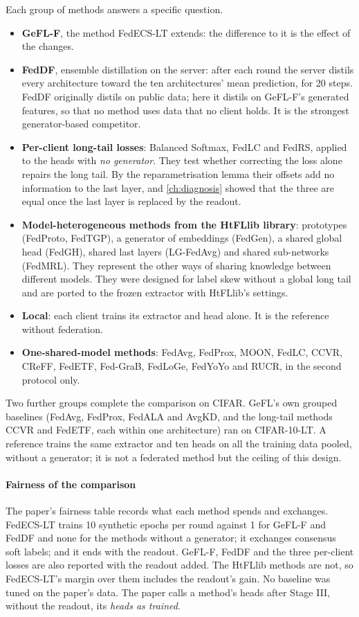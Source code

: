 Each group of methods answers a specific question.
\begin{itemize}
\item \textbf{GeFL-F}, the method FedECS-LT extends: the difference to it is the effect of the changes.
\item \textbf{FedDF}, ensemble distillation on the server: after each round the server distils every architecture
toward the ten architectures' mean prediction, for 20 steps. FedDF originally distils on public data; here it distils
on GeFL-F's generated features, so that no method uses data that no client holds. It is the strongest generator-based
competitor.
\item \textbf{Per-client long-tail losses}: Balanced Softmax, FedLC and FedRS, applied to the heads with \emph{no
generator}. They test whether correcting the loss alone repairs the long tail. By the reparametrisation lemma their
offsets add no information to the last layer, and \cref{ch:diagnosis} showed that the three are equal once the last
layer is replaced by the readout.
\item \textbf{Model-heterogeneous methods from the HtFLlib library}: prototypes (FedProto, FedTGP), a generator of
embeddings (FedGen), a shared global head (FedGH), shared last layers (LG-FedAvg) and shared sub-networks (FedMRL). They
represent the other ways of sharing knowledge between different models. They were designed for label skew without a
global long tail and are ported to the frozen extractor with HtFLlib's settings.
\item \textbf{Local}: each client trains its extractor and head alone. It is the reference without federation.
\item \textbf{One-shared-model methods}: FedAvg, FedProx, MOON, FedLC, CCVR, CReFF, FedETF, Fed-GraB, FedLoGe, FedYoYo
and RUCR, in the second protocol only.
\end{itemize}
Two further groups complete the comparison on CIFAR. GeFL's own grouped baselines (FedAvg, FedProx, FedALA and AvgKD,
and the long-tail methods CCVR and FedETF, each within one architecture) ran on CIFAR-10-LT. A reference trains the
same extractor and ten heads on all the training data pooled, without a generator; it is not a federated method but
the ceiling of this design.

\paragraph{Fairness of the comparison} The paper's fairness table records what each method spends and exchanges.
FedECS-LT trains 10 synthetic epochs per round against 1 for GeFL-F and FedDF and none for the methods without a
generator; it exchanges consensus soft labels; and it ends with the readout. GeFL-F, FedDF and the three per-client losses are
also reported with the readout added. The HtFLlib methods are not, so FedECS-LT's margin over them includes the
readout's gain. No baseline was tuned on the paper's data. The paper calls a method's heads after Stage III, without
the readout, its \emph{heads as trained}.

